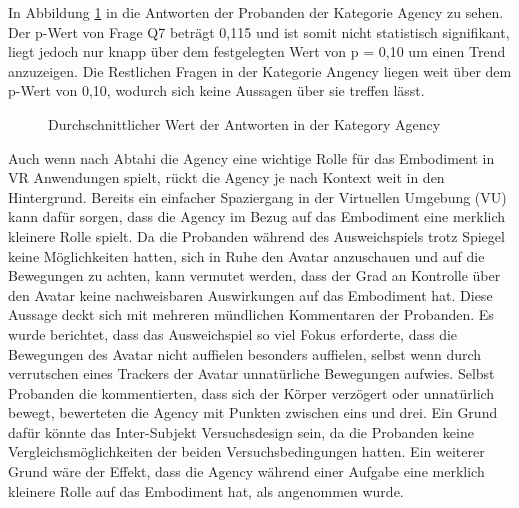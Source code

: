 In Abbildung \ref{fig:AgencyScores} in die Antworten der Probanden der Kategorie Agency zu sehen. Der p-Wert von Frage Q7 beträgt 0,115 und ist somit nicht statistisch signifikant, liegt jedoch nur knapp über dem festgelegten Wert von p = 0,10 um einen Trend anzuzeigen. Die Restlichen Fragen in der Kategorie Angency liegen weit über dem p-Wert von 0,10, wodurch sich keine Aussagen über sie treffen lässt.

\begin{figure}[h]
  \caption[Durchschnittlicher Wert der Antworten in der Kategory Agency]{Durchschnittlicher Wert der Antworten in der Kategory Agency}
  \label{fig:AgencyScores}
\end{figure}


Auch wenn nach Abtahi \cite{Abtahi2019} die Agency eine wichtige Rolle für das Embodiment in VR Anwendungen spielt, rückt die Agency je nach Kontext weit in den Hintergrund. Bereits ein einfacher Spaziergang in der Virtuellen Umgebung (VU) kann dafür sorgen, dass die Agency im Bezug auf das Embodiment eine merklich kleinere Rolle spielt. Da die Probanden während des Ausweichspiels trotz Spiegel keine Möglichkeiten hatten, sich in Ruhe den Avatar anzuschauen und auf die Bewegungen zu achten, kann vermutet werden, dass der Grad an Kontrolle über den Avatar keine nachweisbaren Auswirkungen auf das Embodiment hat. Diese Aussage deckt sich mit mehreren mündlichen Kommentaren der Probanden. Es wurde berichtet, dass das Ausweichspiel so viel Fokus erforderte, dass die Bewegungen des Avatar nicht auffielen besonders auffielen, selbst wenn durch verrutschen eines Trackers der Avatar unnatürliche Bewegungen aufwies.
Selbst Probanden die kommentierten, dass sich der Körper verzögert oder unnatürlich bewegt, bewerteten die Agency mit Punkten zwischen eins und drei. Ein Grund dafür könnte das Inter-Subjekt Versuchsdesign sein, da die Probanden keine Vergleichsmöglichkeiten der beiden Versuchsbedingungen hatten. Ein weiterer Grund wäre der Effekt, dass die Agency während einer Aufgabe eine merklich kleinere Rolle auf das Embodiment hat, als angenommen wurde.


